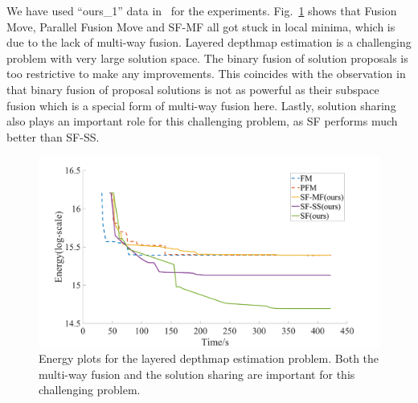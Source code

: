 
\noindent We have used ``ours\_1'' data in~\cite{layered_depthmap} for
the experiments. Fig.~\ref{fig:layered_depthmap_convergence} shows that
Fusion Move, Parallel Fusion Move and SF-MF all got stuck in local
minima, which is due to the lack of multi-way fusion.  Layered depthmap
estimation is a challenging problem with very large solution space. The
binary fusion of solution proposals is too restrictive to make any
improvements.  This coincides with the observation in
\cite{layered_depthmap} that binary fusion of proposal solutions is not
as powerful as their subspace fusion which is a special form of
multi-way fusion here. Lastly, solution sharing also plays an important
role for this challenging problem, as SF performs much better than
SF-SS.

\begin{figure}[!h]
  \centering
  \includegraphics[width=0.8\columnwidth]{figure/layered_depthmap_convergence.png}
  \caption{Energy plots for the layered depthmap estimation
    problem. Both the multi-way fusion and the solution sharing are important
    for this challenging problem.}\label{fig:layered_depthmap_convergence}
\end{figure}

